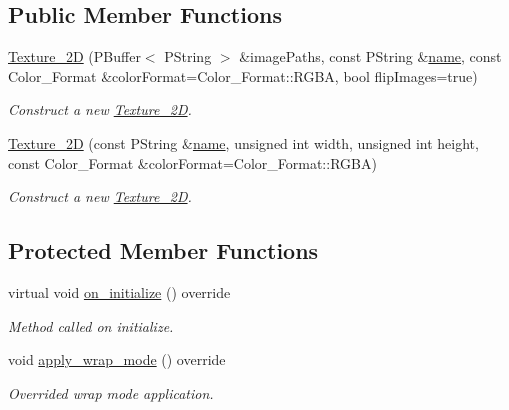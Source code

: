 \subsection*{Public Member Functions}
\begin{DoxyCompactItemize}
\item 
\mbox{\hyperlink{classprz_1_1_texture__2_d_a954cc43fd1a1bc40866985749e795547}{Texture\+\_\+2D}} (P\+Buffer$<$ P\+String $>$ \&image\+Paths, const P\+String \&\mbox{\hyperlink{classprz_1_1_texture_ad6163bf48f820adc4665d227bcd5c258}{name}}, const Color\+\_\+\+Format \&color\+Format=Color\+\_\+\+Format\+::\+R\+G\+BA, bool flip\+Images=true)
\begin{DoxyCompactList}\small\item\em Construct a new \mbox{\hyperlink{classprz_1_1_texture__2_d}{Texture\+\_\+2D}}. \end{DoxyCompactList}\item 
\mbox{\hyperlink{classprz_1_1_texture__2_d_afc1007f077b357d4203993e40b08eed9}{Texture\+\_\+2D}} (const P\+String \&\mbox{\hyperlink{classprz_1_1_texture_ad6163bf48f820adc4665d227bcd5c258}{name}}, unsigned int width, unsigned int height, const Color\+\_\+\+Format \&color\+Format=Color\+\_\+\+Format\+::\+R\+G\+BA)
\begin{DoxyCompactList}\small\item\em Construct a new \mbox{\hyperlink{classprz_1_1_texture__2_d}{Texture\+\_\+2D}}. \end{DoxyCompactList}\end{DoxyCompactItemize}
\subsection*{Protected Member Functions}
\begin{DoxyCompactItemize}
\item 
virtual void \mbox{\hyperlink{classprz_1_1_texture__2_d_abf56074e463a4811b4e64ccf61931d94}{on\+\_\+initialize}} () override
\begin{DoxyCompactList}\small\item\em Method called on initialize. \end{DoxyCompactList}\item 
void \mbox{\hyperlink{classprz_1_1_texture__2_d_ac8639f22c51ad83198fb8d1a7c257ac2}{apply\+\_\+wrap\+\_\+mode}} () override
\begin{DoxyCompactList}\small\item\em Overrided wrap mode application. \end{DoxyCompactList}\end{DoxyCompactItemize}
